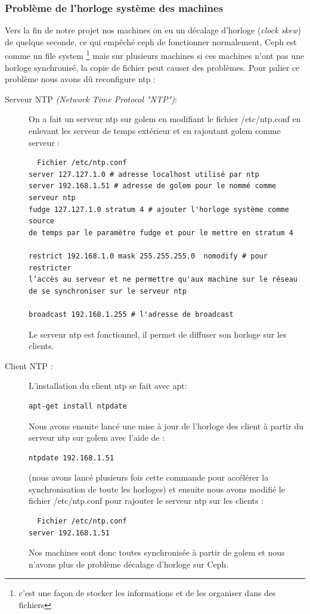 \documentclass[12pt]{article}
\begin{document}
	\subsubsection{Problème de l'horloge système des machines}
Vers la fin de notre projet nos machines on eu un décalage d'horloge (\textit{clock skew}) de quelque seconde, ce qui empêché ceph de fonctionner normalement, Ceph est comme un file system \footnote{c'est une façon de stocker les informations et de les organiser dans des fichiers} mais sur plusieurs machines si ces machines n'ont pas une horloge synchronisé, la copie de fichier peut causer des problèmes. Pour palier ce problème nous avons dû reconfigure ntp :
\begin{description}
\item[Serveur NTP \textit{(Network Time Protocol "NTP")}:] 
On a fait un serveur ntp sur golem en modifiant le fichier /etc/ntp.conf en enlevant les serveur de temps extérieur et en rajoutant golem comme serveur :

\begin{verbatim}
  Fichier /etc/ntp.conf
server 127.127.1.0 # adresse localhost utilisé par ntp
server 192.168.1.51 # adresse de golem pour le nommé comme serveur ntp
fudge 127.127.1.0 stratum 4 # ajouter l'horloge système comme source 
de temps par le paramètre fudge et pour le mettre en stratum 4

restrict 192.168.1.0 mask 255.255.255.0  nomodify # pour restricter
l’accès au serveur et ne permettre qu'aux machine sur le réseau
de se synchroniser sur le serveur ntp

broadcast 192.168.1.255 # l'adresse de broadcast 
\end{verbatim}

Le serveur ntp est fonctionnel, il permet de diffuser son horloge sur les clients.
\item [Client NTP :]
L'installation du client ntp se fait avec apt:
\begin{verbatim}
apt-get install ntpdate
\end{verbatim}

Nous avons ensuite lancé une mise à jour de l'horloge des client à partir du serveur ntp sur golem avec l'aide de :
\begin{verbatim}
ntpdate 192.168.1.51
\end{verbatim}
 (nous avons lancé plusieurs fois cette commande pour accélérer la synchronisation de toute les horloges)
et ensuite nous avons modifié le fichier /etc/ntp.conf pour rajouter le serveur ntp sur les clients :
\begin{verbatim}
  Fichier /etc/ntp.conf
server 192.168.1.51 
\end{verbatim}

Nos machines sont donc toutes synchronisée à partir de golem et nous n'avons plus de problème décalage d'horloge sur Ceph.
\end{description}
\end{document}
